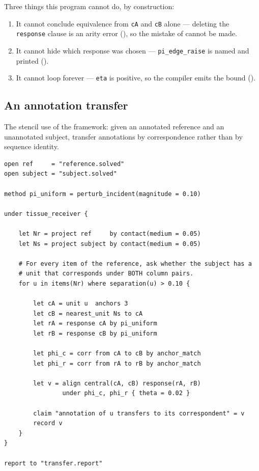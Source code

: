 \documentclass[11pt,twocolumn,a4paper]{article}
\theoremstyle{plain}
\theoremstyle{definition}
\theoremstyle{remark}
\begin{document}
\noindent Three things this program cannot do, by construction:

\begin{enumerate}[label=(\roman*),leftmargin=2.2em]
\item It cannot conclude equivalence from \texttt{cA} and \texttt{cB}
      alone --- deleting the \texttt{response} clause is an arity error
      (), so the mistake of 
      cannot be made.
\item It cannot hide which response was chosen --- \texttt{pi\_edge\_raise}
      is named and printed ().
\item It cannot loop forever --- \texttt{eta} is positive, so the
      compiler emits the bound ().
\end{enumerate}

\subsection{An annotation transfer}

The stencil use of the framework: given an annotated reference and an
unannotated subject, transfer annotations by correspondence rather than
by sequence identity.

\begin{lstlisting}[caption={\texttt{transfer.syp}}]
open ref     = "reference.solved"
open subject = "subject.solved"

method pi_uniform = perturb_incident(magnitude = 0.10)

under tissue_receiver {

    let Nr = project ref     by contact(medium = 0.05)
    let Ns = project subject by contact(medium = 0.05)

    # For every item of the reference, ask whether the subject has a
    # unit that corresponds under BOTH column pairs.
    for u in items(Nr) where separation(u) > 0.10 {

        let cA = unit u  anchors 3
        let cB = nearest_unit Ns to cA
        let rA = response cA by pi_uniform
        let rB = response cB by pi_uniform

        let phi_c = corr from cA to cB by anchor_match
        let phi_r = corr from rA to rB by anchor_match

        let v = align central(cA, cB) response(rA, rB)
                under phi_c, phi_r { theta = 0.02 }

        claim "annotation of u transfers to its correspondent" = v
        record v
    }
}

report to "transfer.report"
\end{lstlisting}
\end{document}

